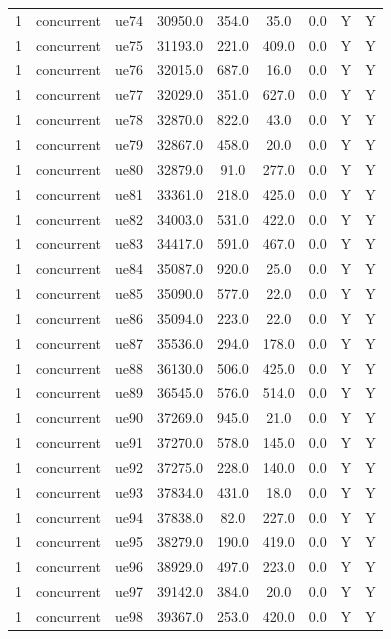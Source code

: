 \begin{table}[ht]
\begin{tabular}{|c|c|c|c|c|c|c|c|c|}
1 & concurrent & ue74 & 30950.0 & 354.0 & 35.0 & 0.0 & Y & Y \\
1 & concurrent & ue75 & 31193.0 & 221.0 & 409.0 & 0.0 & Y & Y \\
1 & concurrent & ue76 & 32015.0 & 687.0 & 16.0 & 0.0 & Y & Y \\
1 & concurrent & ue77 & 32029.0 & 351.0 & 627.0 & 0.0 & Y & Y \\
1 & concurrent & ue78 & 32870.0 & 822.0 & 43.0 & 0.0 & Y & Y \\
1 & concurrent & ue79 & 32867.0 & 458.0 & 20.0 & 0.0 & Y & Y \\
1 & concurrent & ue80 & 32879.0 & 91.0 & 277.0 & 0.0 & Y & Y \\
1 & concurrent & ue81 & 33361.0 & 218.0 & 425.0 & 0.0 & Y & Y \\
1 & concurrent & ue82 & 34003.0 & 531.0 & 422.0 & 0.0 & Y & Y \\
1 & concurrent & ue83 & 34417.0 & 591.0 & 467.0 & 0.0 & Y & Y \\
1 & concurrent & ue84 & 35087.0 & 920.0 & 25.0 & 0.0 & Y & Y \\
1 & concurrent & ue85 & 35090.0 & 577.0 & 22.0 & 0.0 & Y & Y \\
1 & concurrent & ue86 & 35094.0 & 223.0 & 22.0 & 0.0 & Y & Y \\
1 & concurrent & ue87 & 35536.0 & 294.0 & 178.0 & 0.0 & Y & Y \\
1 & concurrent & ue88 & 36130.0 & 506.0 & 425.0 & 0.0 & Y & Y \\
1 & concurrent & ue89 & 36545.0 & 576.0 & 514.0 & 0.0 & Y & Y \\
1 & concurrent & ue90 & 37269.0 & 945.0 & 21.0 & 0.0 & Y & Y \\
1 & concurrent & ue91 & 37270.0 & 578.0 & 145.0 & 0.0 & Y & Y \\
1 & concurrent & ue92 & 37275.0 & 228.0 & 140.0 & 0.0 & Y & Y \\
1 & concurrent & ue93 & 37834.0 & 431.0 & 18.0 & 0.0 & Y & Y \\
1 & concurrent & ue94 & 37838.0 & 82.0 & 227.0 & 0.0 & Y & Y \\
1 & concurrent & ue95 & 38279.0 & 190.0 & 419.0 & 0.0 & Y & Y \\
1 & concurrent & ue96 & 38929.0 & 497.0 & 223.0 & 0.0 & Y & Y \\
1 & concurrent & ue97 & 39142.0 & 384.0 & 20.0 & 0.0 & Y & Y \\
1 & concurrent & ue98 & 39367.0 & 253.0 & 420.0 & 0.0 & Y & Y \\

\end{tabular}
\end{table}
